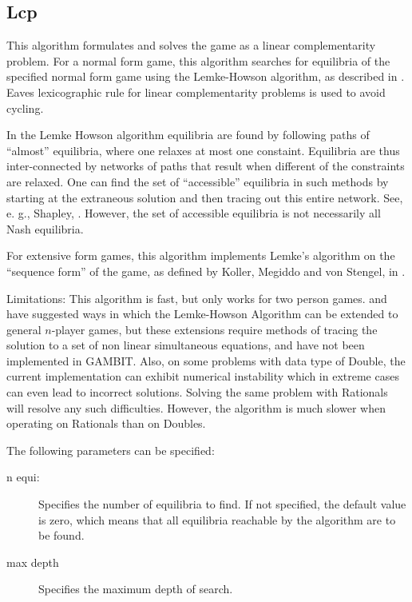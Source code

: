 \subsection{Lcp}\label{Lcp}
This algorithm formulates and solves the game as a linear complementarity problem.  
For a normal form game, this algorithm searches for equilibria of the
specified normal form game using the Lemke-Howson algorithm, as described
in \cite{LemHow:64}. Eaves \cite{Eav:71} lexicographic rule for
linear complementarity problems is used to avoid cycling.

In the Lemke Howson algorithm equilibria are found by following paths of
``almost'' equilibria, where one relaxes at most one constaint.
Equilibria are thus inter-connected by networks of paths that result when
different of the constraints are relaxed.  One can find the set of
``accessible''  equilibria in such methods by starting at the extraneous
solution and then tracing out this entire network.  See, e. g., Shapley,
\cite{Sha:74}.  However, the set of accessible equilibria is not necessarily all
Nash equilibria.

For extensive form games, this algorithm implements Lemke's algorithm
on the ``sequence form'' of the game, as defined by Koller, Megiddo 
and von Stengel, in \cite{KolMegSte:94}.

Limitations: This algorithm is fast, but only works for two person
games.  \cite{Wilson:1971} and \cite{Rosenmuller:1971} have suggested
ways in which the Lemke-Howson Algorithm can be extended to general 
$n$-player games, but these extensions require methods of tracing the 
solution to a set of non linear simultaneous equations, and have not 
been implemented in GAMBIT.  Also, on some problems with data type of 
Double, the current implementation can exhibit numerical instability 
which in extreme cases can even lead to incorrect solutions.  Solving 
the same problem with Rationals will resolve any such difficulties.
However, the algorithm is much slower when operating on Rationals than 
on Doubles.

The following parameters can be specified:

\begin{description}
\item[n equi:] Specifies the number of equilibria to find.  If not specified,
the default value is zero, which means that all equilibria reachable by
the algorithm are to be found.
\item[max depth]
Specifies the maximum depth of search.
\end{description}

